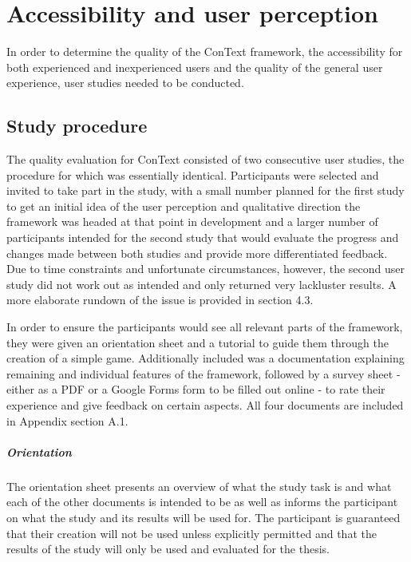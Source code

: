 
\chapter{Accessibility and user perception}\label{chapter:userstudy}
In order to determine the quality of the ConText framework, the accessibility for both experienced and inexperienced users and the quality of the general user experience, user studies needed to be conducted. 

\section{Study procedure}
The quality evaluation for ConText consisted of two consecutive user studies, the procedure for which was essentially identical. Participants were selected and invited to take part in the study, with a small number planned for the first study to get an initial idea of the user perception and qualitative direction the framework was headed at that point in development and a larger number of participants intended for the second study that would evaluate the progress and changes made between both studies and provide more differentiated  feedback. Due to time constraints and unfortunate circumstances, however, the second user study did not work out as intended and only returned very lackluster results. A more elaborate rundown of the issue is provided in section 4.3.

In order to ensure the participants would see all relevant parts of the framework, they were given an orientation sheet and a tutorial to guide them through the creation of a simple game. Additionally included was a documentation explaining remaining and individual features of the framework, followed by a survey sheet - either as a PDF or a Google Forms form to be filled out online - to rate their experience and give feedback on certain aspects.
All four documents are included in Appendix section A.1.
\paragraph{Orientation} The orientation sheet presents an overview of what the study task is and what each of the other documents is intended to be as well as informs the participant on what the study and its results will be used for. The participant is guaranteed that their creation will not be used unless explicitly permitted and that the results of the study will only be used and evaluated for the thesis.
